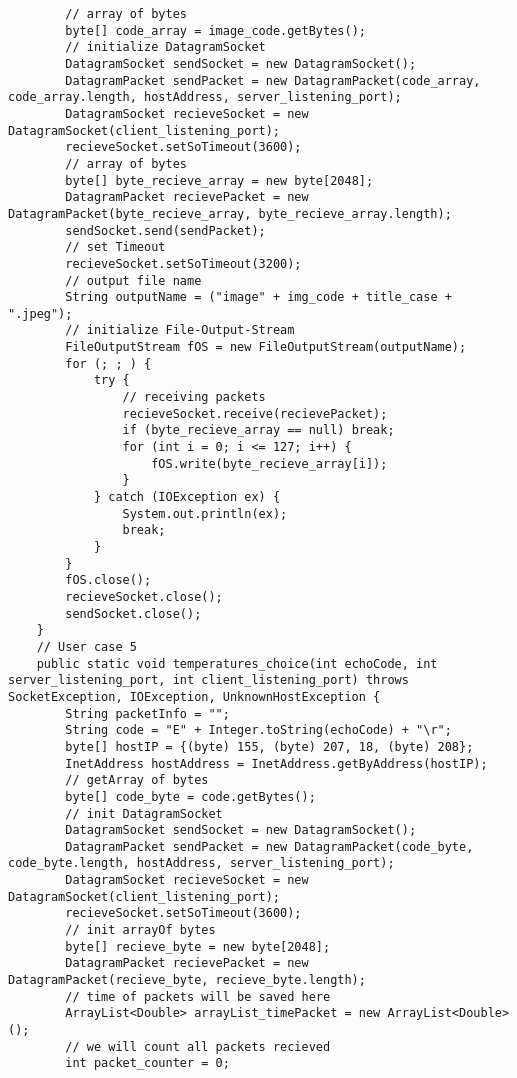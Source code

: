 \documentclass{article}
\begin{document}
\begin{lstlisting}
        // array of bytes
        byte[] code_array = image_code.getBytes();
        // initialize DatagramSocket
        DatagramSocket sendSocket = new DatagramSocket();
        DatagramPacket sendPacket = new DatagramPacket(code_array, code_array.length, hostAddress, server_listening_port);
        DatagramSocket recieveSocket = new DatagramSocket(client_listening_port);
        recieveSocket.setSoTimeout(3600);
        // array of bytes
        byte[] byte_recieve_array = new byte[2048];
        DatagramPacket recievePacket = new DatagramPacket(byte_recieve_array, byte_recieve_array.length);
        sendSocket.send(sendPacket);
        // set Timeout
        recieveSocket.setSoTimeout(3200);
        // output file name
        String outputName = ("image" + img_code + title_case + ".jpeg");
        // initialize File-Output-Stream
        FileOutputStream fOS = new FileOutputStream(outputName);
        for (; ; ) {
            try {
                // receiving packets
                recieveSocket.receive(recievePacket);
                if (byte_recieve_array == null) break;
                for (int i = 0; i <= 127; i++) {
                    fOS.write(byte_recieve_array[i]);
                }
            } catch (IOException ex) {
                System.out.println(ex);
                break;
            }
        }
        fOS.close();
        recieveSocket.close();
        sendSocket.close();
    }
    // User case 5
    public static void temperatures_choice(int echoCode, int server_listening_port, int client_listening_port) throws SocketException, IOException, UnknownHostException {
        String packetInfo = "";
        String code = "E" + Integer.toString(echoCode) + "\r";
        byte[] hostIP = {(byte) 155, (byte) 207, 18, (byte) 208};
        InetAddress hostAddress = InetAddress.getByAddress(hostIP);
        // getArray of bytes
        byte[] code_byte = code.getBytes();
        // init DatagramSocket
        DatagramSocket sendSocket = new DatagramSocket();
        DatagramPacket sendPacket = new DatagramPacket(code_byte, code_byte.length, hostAddress, server_listening_port);
        DatagramSocket recieveSocket = new DatagramSocket(client_listening_port);
        recieveSocket.setSoTimeout(3600);
        // init arrayOf bytes
        byte[] recieve_byte = new byte[2048];
        DatagramPacket recievePacket = new DatagramPacket(recieve_byte, recieve_byte.length);
        // time of packets will be saved here
        ArrayList<Double> arrayList_timePacket = new ArrayList<Double>();
        // we will count all packets recieved
        int packet_counter = 0;

\end{lstlisting}
\end{document}
